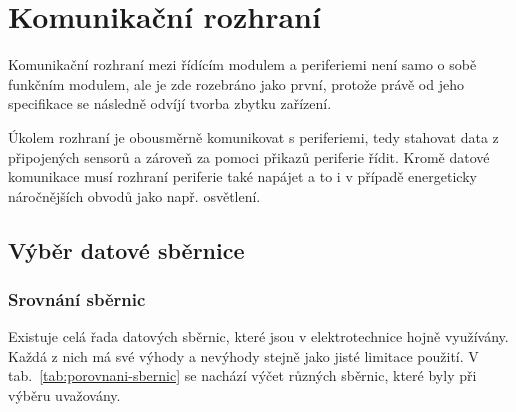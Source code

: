 \section{Komunikační rozhraní}
\label{sec:komunikacni-rozhrani}
    Komunikační rozhraní mezi řídícím modulem a periferiemi není samo o sobě funkčním modulem, ale je zde rozebráno jako první, protože právě od jeho specifikace se následně odvíjí tvorba zbytku zařízení. 

    Úkolem rozhraní je obousměrně komunikovat s periferiemi, tedy stahovat data z připojených sensorů a zároveň za pomoci přikazů periferie řídit. Kromě datové komunikace musí rozhraní periferie také napájet a to i v případě energeticky náročnějších obvodů jako např. osvětlení. 
    
    \subsection{Výběr datové sběrnice}
    \subsubsection{Srovnání sběrnic}
        Existuje celá řada datových sběrnic, které jsou v elektrotechnice hojně využívány. Každá z nich má své výhody a nevýhody stejně jako jisté limitace použití. V tab.~\ref{tab:porovnani-sbernic} se nachází výčet různých sběrnic, které byly při výběru uvažovány. 

